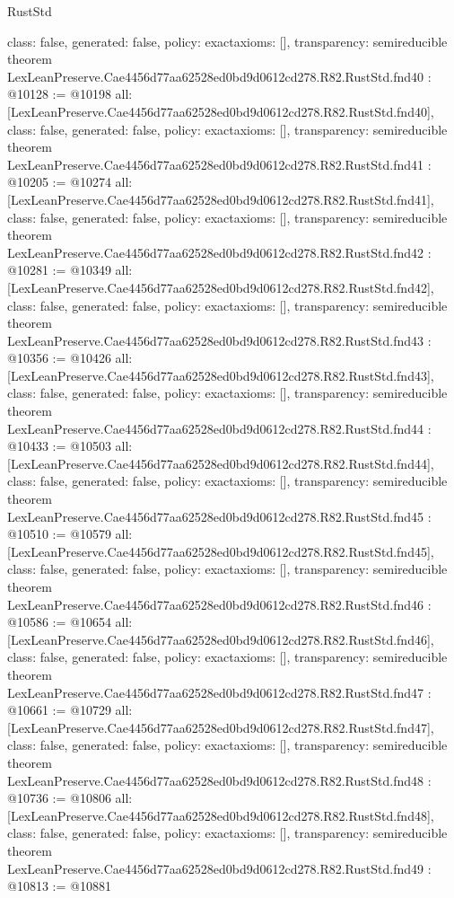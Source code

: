 \begin{lexlean}{RustStd}
\begin{coremodule}
{  class: false,
  generated: false,
  policy: exact{axioms: []},
  transparency: semireducible
}
theorem LexLeanPreserve.Cae4456d77aa62528ed0bd9d0612cd278.R82.RustStd.fnd40 : @10128 := @10198 {
  all: [LexLeanPreserve.Cae4456d77aa62528ed0bd9d0612cd278.R82.RustStd.fnd40],
  class: false,
  generated: false,
  policy: exact{axioms: []},
  transparency: semireducible
}
theorem LexLeanPreserve.Cae4456d77aa62528ed0bd9d0612cd278.R82.RustStd.fnd41 : @10205 := @10274 {
  all: [LexLeanPreserve.Cae4456d77aa62528ed0bd9d0612cd278.R82.RustStd.fnd41],
  class: false,
  generated: false,
  policy: exact{axioms: []},
  transparency: semireducible
}
theorem LexLeanPreserve.Cae4456d77aa62528ed0bd9d0612cd278.R82.RustStd.fnd42 : @10281 := @10349 {
  all: [LexLeanPreserve.Cae4456d77aa62528ed0bd9d0612cd278.R82.RustStd.fnd42],
  class: false,
  generated: false,
  policy: exact{axioms: []},
  transparency: semireducible
}
theorem LexLeanPreserve.Cae4456d77aa62528ed0bd9d0612cd278.R82.RustStd.fnd43 : @10356 := @10426 {
  all: [LexLeanPreserve.Cae4456d77aa62528ed0bd9d0612cd278.R82.RustStd.fnd43],
  class: false,
  generated: false,
  policy: exact{axioms: []},
  transparency: semireducible
}
theorem LexLeanPreserve.Cae4456d77aa62528ed0bd9d0612cd278.R82.RustStd.fnd44 : @10433 := @10503 {
  all: [LexLeanPreserve.Cae4456d77aa62528ed0bd9d0612cd278.R82.RustStd.fnd44],
  class: false,
  generated: false,
  policy: exact{axioms: []},
  transparency: semireducible
}
theorem LexLeanPreserve.Cae4456d77aa62528ed0bd9d0612cd278.R82.RustStd.fnd45 : @10510 := @10579 {
  all: [LexLeanPreserve.Cae4456d77aa62528ed0bd9d0612cd278.R82.RustStd.fnd45],
  class: false,
  generated: false,
  policy: exact{axioms: []},
  transparency: semireducible
}
theorem LexLeanPreserve.Cae4456d77aa62528ed0bd9d0612cd278.R82.RustStd.fnd46 : @10586 := @10654 {
  all: [LexLeanPreserve.Cae4456d77aa62528ed0bd9d0612cd278.R82.RustStd.fnd46],
  class: false,
  generated: false,
  policy: exact{axioms: []},
  transparency: semireducible
}
theorem LexLeanPreserve.Cae4456d77aa62528ed0bd9d0612cd278.R82.RustStd.fnd47 : @10661 := @10729 {
  all: [LexLeanPreserve.Cae4456d77aa62528ed0bd9d0612cd278.R82.RustStd.fnd47],
  class: false,
  generated: false,
  policy: exact{axioms: []},
  transparency: semireducible
}
theorem LexLeanPreserve.Cae4456d77aa62528ed0bd9d0612cd278.R82.RustStd.fnd48 : @10736 := @10806 {
  all: [LexLeanPreserve.Cae4456d77aa62528ed0bd9d0612cd278.R82.RustStd.fnd48],
  class: false,
  generated: false,
  policy: exact{axioms: []},
  transparency: semireducible
}
theorem LexLeanPreserve.Cae4456d77aa62528ed0bd9d0612cd278.R82.RustStd.fnd49 : @10813 := @10881 {
}
\end{coremodule}
\end{lexlean}
